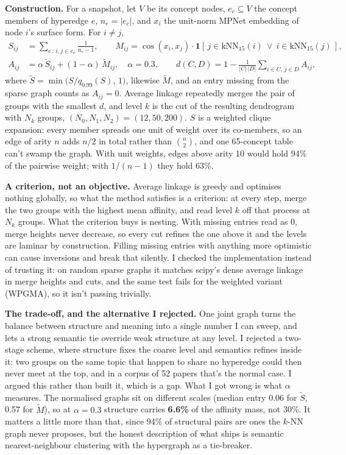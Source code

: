 \documentclass[10pt,a4paper]{article}
\newcommand{\para}[1]{\textbf{#1}\hspace{0.4em}}
\begin{document}
\para{Construction.} For a snapshot, let $V$ be its concept nodes, $e_c \subseteq V$ the concept members
of hyperedge $e$, $n_e = |e_c|$, and $x_i$ the unit-norm MPNet embedding of node $i$'s surface form.
For $i \ne j$,
\begin{align}
S_{ij} &= \sum_{e \,:\, i,j \in e_c} \frac{1}{n_e - 1}, \qquad
M_{ij} = \cos(x_i, x_j)\cdot \mathbf{1}\!\left[\, j \in \mathrm{kNN}_{15}(i) \ \lor\ i \in \mathrm{kNN}_{15}(j) \,\right], \\
A_{ij} &= \alpha\, \tilde S_{ij} + (1-\alpha)\, \tilde M_{ij}, \quad \alpha = 0.3, \qquad
d(C, D) = 1 - \frac{1}{|C|\,|D|} \sum_{i \in C,\, j \in D} A_{ij},
\end{align}
where $\tilde S = \min\!\big(S / q_{0.99}(S),\, 1\big)$, likewise $\tilde M$, and an entry missing from
the sparse graph counts as $A_{ij} = 0$. Average linkage repeatedly merges the pair of groups with the
smallest $d$, and level $k$ is the cut of the resulting dendrogram with $N_k$ groups,
$(N_0, N_1, N_2) = (12, 50, 200)$. $S$ is a weighted clique expansion: every member spreads one unit of
weight over its co-members, so an edge of arity $n$ adds $n/2$ in total rather than $\binom{n}{2}$, and one
65-concept table can't swamp the graph. With unit weights, edges above arity 10 would hold 94\% of the
pairwise weight; with $1/(n-1)$ they hold 63\%.

\para{A criterion, not an objective.} Average linkage is greedy and optimises nothing globally, so what
the method satisfies is a criterion: at every step, merge the two groups with the highest mean affinity,
and read level $k$ off that process at $N_k$ groups. What the criterion buys is nesting. With missing
entries read as 0, merge heights never decrease, so every cut refines the one above it and the levels are
laminar by construction. Filling missing entries with anything more optimistic can cause inversions and
break that silently. I checked the implementation instead of trusting it: on random sparse graphs it
matches scipy's dense average linkage in merge heights and cuts, and the same test fails for the weighted
variant (WPGMA), so it isn't passing trivially.

\para{The trade-off, and the alternative I rejected.} One joint graph turns the balance between structure
and meaning into a single number I can sweep, and lets a strong semantic tie override weak structure at
any level. I rejected a two-stage scheme, where structure fixes the coarse level and semantics refines
inside it: two groups on the same topic that happen to share no hyperedge could then never meet at the
top, and in a corpus of 52 papers that's the normal case. I argued this rather than built it, which is a
gap. What I got wrong is what $\alpha$ measures. The normalised graphs sit on different scales (median
entry 0.06 for $\tilde S$, 0.57 for $\tilde M$), so at $\alpha = 0.3$ structure carries \textbf{6.6\%} of
the affinity mass, not 30\%. It matters a little more than that, since 94\% of structural pairs
are ones the $k$-NN graph never proposes, but the honest description of what ships is semantic
nearest-neighbour clustering with the hypergraph as a tie-breaker.
\end{document}
